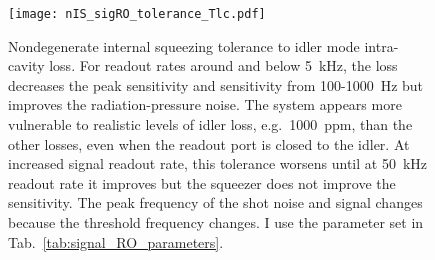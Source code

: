 \begin{figure}
    \centering
    \texttt{[image: nIS\_sigRO\_tolerance\_Tlc.pdf]}
    \caption{Nondegenerate internal squeezing tolerance to idler mode intra-cavity loss. For readout rates around and below 5~kHz, the loss decreases the peak sensitivity and sensitivity from 100-1000~Hz but improves the radiation-pressure noise. The system appears more vulnerable to realistic levels of idler loss, e.g.\ 1000~ppm, than the other losses, even when the readout port is closed to the idler. At increased signal readout rate, this tolerance worsens until at 50~kHz readout rate it improves  but the squeezer does not improve the sensitivity. The peak frequency of the shot noise and signal changes because the threshold frequency changes. I use the parameter set in Tab.~\ref{tab:signal_RO_parameters}.}
    \label{fig:nIS_sigRO_tolerance_Tlc}
\end{figure}

